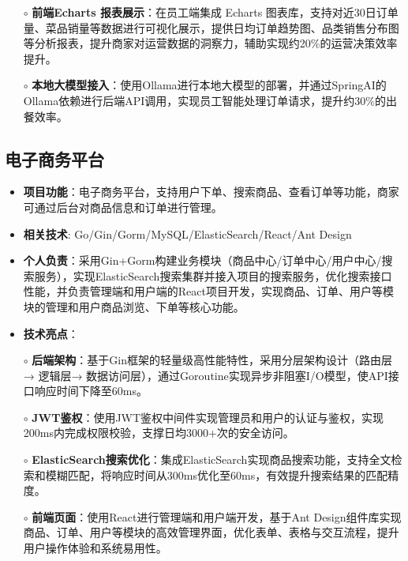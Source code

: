 \documentclass{resume}
\begin{document}
\begin{normalsize}
\begin{itemize}
          \item[$\circ$] \textbf{前端Echarts 报表展示}：在员工端集成 Echarts 图表库，支持对近30日订单量、菜品销量等数据进行可视化展示，提供日均订单趋势图、品类销售分布图等分析报表，提升商家对运营数据的洞察力，辅助实现约20\%的运营决策效率提升。
          \item[$\circ$] \textbf{本地大模型接入}：使用Ollama进行本地大模型的部署，并通过SpringAI的Ollama依赖进行后端API调用，实现员工智能处理订单请求，提升约30\%的出餐效率。
        \end{itemize}
    \end{normalsize}

\subsection{\textbf{电子商务平台} \hspace{2cm}{2024.10 -- 2024.12}}
  \begin{normalsize}
    \begin{itemize}
    \item \textbf{项目功能}：电子商务平台，支持用户下单、搜索商品、查看订单等功能，商家可通过后台对商品信息和订单进行管理。
    \item \textbf{相关技术}: Go/Gin/Gorm/MySQL/ElasticSearch/React/Ant Design
    \item \textbf{个人负责}：采用Gin+Gorm构建业务模块（商品中心/订单中心/用户中心/搜索服务），实现ElasticSearch搜索集群并接入项目的搜索服务，优化搜索接口性能，并负责管理端和用户端的React项目开发，实现商品、订单、用户等模块的管理和用户商品浏览、下单等核心功能。
    \item \textbf{技术亮点}：
    \setlength{\itemindent}{1em} %
      \item[$\circ$] \textbf{后端架构}：基于Gin框架的轻量级高性能特性，采用分层架构设计（路由层→ 逻辑层→ 数据访问层），通过Goroutine实现异步非阻塞I/O模型，使API接口响应时间下降至60ms。
        \item[$\circ$] \textbf{JWT鉴权}：使用JWT鉴权中间件实现管理员和用户的认证与鉴权，实现200ms内完成权限校验，支撑日均3000+次的安全访问。
        \item[$\circ$] \textbf{ElasticSearch搜索优化}：集成ElasticSearch实现商品搜索功能，支持全文检索和模糊匹配，将响应时间从300ms优化至60ms，有效提升搜索结果的匹配精度。
        \item[$\circ$] \textbf{前端页面}：使用React进行管理端和用户端开发，基于Ant Design组件库实现商品、订单、用户等模块的高效管理界面，优化表单、表格与交互流程，提升用户操作体验和系统易用性。
    \end{itemize}
  \end{normalsize}
\end{document}
